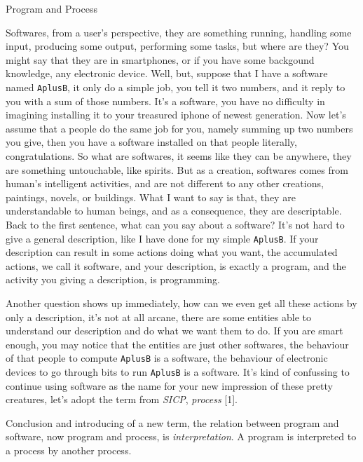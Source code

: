 \newcount{}
{}
\def\ref#1#2#3{\global\advance\refcount by 1
\frenchspacing %
\item{[\the\refcount]} #1. {\sl #2}. #3 \smallskip}

\beginsection Program and Process\par

Softwares, from a user's perspective, they are something running, handling some input,
producing some output, performing some tasks, but where are they?  You might say that they are in
smartphones, or if you have some backgound knowledge, any electronic device.  Well, but,
suppose that I have a software named {\tt AplusB}, it only do a simple job, you tell it two numbers,
and it reply to you with a sum of those numbers.  It's a software, you have no difficulty
in imagining installing it to your treasured iphone of newest generation.  Now let's assume that a people do the
same job for you, namely summing up two numbers you give, then you have a software installed on
that people literally, congratulations.  So what are softwares, it seems like they can be anywhere,
they are something untouchable, like spirits.
But as a creation, softwares comes from human's intelligent activities, and are not different
to any other creations, paintings, novels, or buildings.  What I want to say is that,
they are understandable to human beings, and as a consequence, they are descriptable.
Back to the first sentence, what can you say about a software? It's not hard to give a general
description, like I have done for my simple {\tt AplusB}.  If your description can result
in some actions doing what you want, the accumulated actions, we call it software,
and your description, is exactly a program, and the activity you giving a description,
is programming.

Another question shows up immediately, how can we even get all these actions by only a description,
it's not at all arcane, there are some entities able to understand our description
and do what we want them to do.  If you are smart enough, you may notice that the entities are
just other softwares, the behaviour of that people to compute {\tt AplusB} is a software,
the behaviour of electronic devices to go through bits to run {\tt AplusB} is a software.
It's kind of confussing to continue using software as the name for your new impression of these
pretty creatures, let's adopt the term from {\sl SICP}, {\it process} [1].

Conclusion and introducing of a new term, the relation between program and software,
now program and process, is {\it interpretation}.  A program is interpreted to a process by another process.

